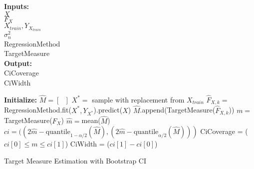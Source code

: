 \begin{algorithm}[!ht]
 \hspace*{\algorithmicindent} \textbf{Inputs:} \\
 \hspace*{\algorithmicindent} $X$  \\
 \hspace*{\algorithmicindent} $F_X$   \\
 \hspace*{\algorithmicindent} $X_{train}, Y_{X_{train}}$  \\
 \hspace*{\algorithmicindent} $\sigma_n^2$  \\
 \hspace*{\algorithmicindent} RegressionMethod  \\
 \hspace*{\algorithmicindent} TargetMeasure  \\
 \hspace*{\algorithmicindent} \textbf{Output:} \\
 \hspace*{\algorithmicindent} CiCoverage \\
 \hspace*{\algorithmicindent} CiWidth \\
\begin{algorithmic}[1]
    \State \textbf{Initialize:} $\hat{M} = \left[ \text{ } \right]$
     
        \State $X^{\ast} = $ sample with replacement from $X_{train}$
        \State $\hat{F}_{X,k} = $ RegressionMethod.fit($X^{\ast}, Y_{X^{\ast}}$).predict($X$)
        \State $\hat{M}$.append(TargetMeasure($\hat{F}_{X, k}$)) 
    \EndFor
    \State $m =$ TargetMeasure($F_X$) 
    \State $\hat{m} = $mean($\hat{M}$)
    \State $ci = ((2\hat{m} - \text{quantile}_{1-\alpha/2}(\hat{M}), (2\hat{m} - \text{quantile}_{\alpha/2}(\hat{M})))$ 
    \State CiCoverage = ($ ci\left[ 0 \right] \leq m \leq ci\left[ 1 \right]$)
    \State CiWidth = ($ci\left[ 1 \right] - ci\left[ 0 \right] $)
\end{algorithmic}
\caption{Target Measure Estimation with Bootstrap CI
}
 \label{pc:target-measure-baseline}
\end{algorithm}




